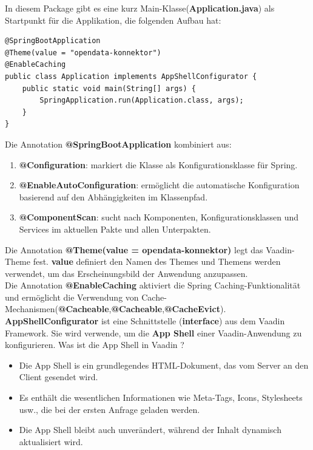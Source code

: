 \documentclass[a4paper,12pt]{scrreprt}
\begin{document}
In diesem Package gibt es eine kurz Main-Klasse(\textbf{Application.java}) als Startpunkt für die Applikation, die folgenden Aufbau hat: \\
\begin{lstlisting}
@SpringBootApplication
@Theme(value = "opendata-konnektor")
@EnableCaching
public class Application implements AppShellConfigurator {
	public static void main(String[] args) {
		SpringApplication.run(Application.class, args);
	}
}
\end{lstlisting}
	Die Annotation \textbf{@SpringBootApplication} kombiniert aus:
		\begin{enumerate}
			\item  \textbf{@Configuration}: markiert die Klasse als Konfigurationsklasse für Spring.
			\item  \textbf{@EnableAutoConfiguration}: ermöglicht die automatische Konfiguration basierend auf den Abhängigkeiten im Klassenpfad.
			\item  \textbf{@ComponentScan}: sucht nach Komponenten, Konfigurationsklassen und Services im aktuellen Pakte und allen Unterpakten.
		\end{enumerate}
	Die Annotation \textbf{@Theme(value = opendata-konnektor)} legt das Vaadin-Theme fest. \textbf{value} definiert den Namen des Themes und Themens werden verwendet, um das Erscheinungsbild der Anwendung anzupassen.\\
	Die Annotation \textbf{@EnableCaching} aktiviert die Spring Caching-Funktionalität und ermöglicht die Verwendung von Cache-Mechanismen(\textbf{@Cacheable},\textbf{@Cacheable},\textbf{@CacheEvict}).\\
	\textbf{AppShellConfigurator} ist eine Schnittstelle (\textbf{interface}) aus dem Vaadin Framework. Sie wird verwende, um die \textbf{App Shell} einer Vaadin-Anwendung zu konfigurieren. Was ist die App Shell in Vaadin ?
	\begin{itemize}
		\item Die App Shell is ein grundlegendes HTML-Dokument, das vom Server an den Client gesendet wird.
		\item Es enthält die wesentlichen Informationen wie Meta-Tags, Icons, Stylesheets usw., die bei der ersten Anfrage geladen werden.
		\item Die App Shell bleibt auch unverändert, während der Inhalt dynamisch aktualisiert wird.
	\end{itemize}
	
\end{document}
